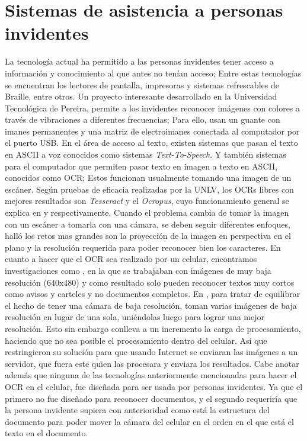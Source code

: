 \documentclass{article}
\begin{document}
	\section{Sistemas de asistencia a personas invidentes}
	La tecnología actual ha permitido a las personas invidentes tener acceso a información
	y conocimiento al que antes no tenían acceso; Entre estas tecnologías se encuentran los
	lectores de pantalla, impresoras y sistemas refrescables de Braille, entre otros.
	Un proyecto interesante desarrollado en la Universidad Tecnológica de Pereira, permite
	a los invidentes reconocer imágenes con colores a través de vibraciones a diferentes
	frecuencias\cite{iris04}; Para ello, usan un guante con imanes permanentes y una matriz
	de electroimanes conectada al computador por el puerto USB.
	En el área de acceso al texto, existen sistemas que pasan el texto en ASCII a voz
	conocidos como sistemas \textit{Text-To-Speech}. Y también sistemas para el computador
	que permiten pasar texto en imagen a texto en ASCII, conocidos como OCR; Estos funcionan
	usualmente tomando una imagen de un escáner. Según pruebas de eficacia realizadas por
	la UNLV, los OCRs libres con mejores resultados son	\textit{Tesseract} y el 
	\textit{Ocropus}, cuyo funcionamiento general se explica en \cite{tesseract1} y
	\cite{ocropus1} respectivamente.\newline
	Cuando el problema cambia de tomar la imagen con un escáner a tomarla con una cámara,
	se deben seguir diferentes enfoques, \cite{doc_analysis3} halló los retos mas
	grandes son la proyección de la imagen en perspectiva en el plano y la resolución
	requerida para poder reconocer bien los caracteres.
	En cuanto a hacer que el OCR sea realizado por un celular, encontramos investigaciones
	como \cite{mob_smallpic}, en la que se trabajaban con imágenes de muy baja resolución
	(640x480) y como resultado solo pueden reconocer textos muy cortos como avisos y carteles
	y no documentos completos.
	En \cite{mob_withpc}, para tratar de equilibrar el hecho de tener una cámara de baja
	resolución, toman varias imágenes de baja resolución en lugar de una sola, uniéndolas
	luego para lograr una mejor resolución. Esto sin embargo conlleva a un incremento la
	carga de procesamiento, haciendo que no sea posible el procesamiento dentro del celular.
	Así que restringieron su solución para que usando Internet se enviaran las imágenes a un
	servidor, que fuera este quien las procesara y enviara los resultados.\newline
	Cabe anotar además que ninguna de las tecnologías anteriormente mencionadas para hacer
	el OCR en el celular, fue diseñada para ser usada por personas invidentes. Ya que el 
	primero no fue diseñado para reconocer documentos, y el segundo requeriría que la persona
	invidente supiera con anterioridad como está la estructura del documento para poder mover
	la cámara del celular en el orden en el que está el texto en el documento.
	


\end{document}
